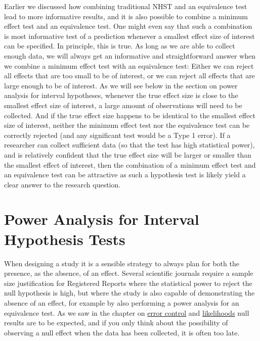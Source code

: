 \documentclass[
  oneside]{book}
\begin{document}
Earlier we discussed how combining traditional NHST and an equivalence test lead to more informative results, and it is also possible to combine a minimum effect test and an equivalence test. One might even say that such a combination is most informative test of a prediction whenever a smallest effect size of interest can be specified. In principle, this is true. As long as we are able to collect enough data, we will always get an informative and straightforward answer when we combine a minimum effect test with an equivalence test: Either we can reject all effects that are too small to be of interest, or we can reject all effects that are large enough to be of interest. As we will see below in the section on power analysis for interval hypotheses, whenever the true effect size is close to the smallest effect size of interest, a large amount of observations will need to be collected. And if the true effect size happens to be identical to the smallest effect size of interest, neither the minimum effect test nor the equivalence test can be correctly rejected (and any significant test would be a Type 1 error). If a researcher can collect sufficient data (so that the test has high statistical power), and is relatively confident that the true effect size will be larger or smaller than the smallest effect of interest, then the combination of a minimum effect test and an equivalence test can be attractive as such a hypothesis test is likely yield a clear answer to the research question.

\hypertarget{power-analysis-for-interval-hypothesis-tests}{%
\section{Power Analysis for Interval Hypothesis Tests}\label{power-analysis-for-interval-hypothesis-tests}}

When designing a study it is a sensible strategy to always plan for both the presence, as the absence, of an effect. Several scientific journals require a sample size justification for Registered Reports where the statistical power to reject the null hypothesis is high, but where the study is also capable of demonstrating the absence of an effect, for example by also performing a power analysis for an equivalence test. As we saw in the chapter on \protect\hyperlink{errorcontrol}{error control} and \protect\hyperlink{likelihoods}{likelihoods} null results are to be expected, and if you only think about the possibility of observing a null effect when the data has been collected, it is often too late.
\end{document}
